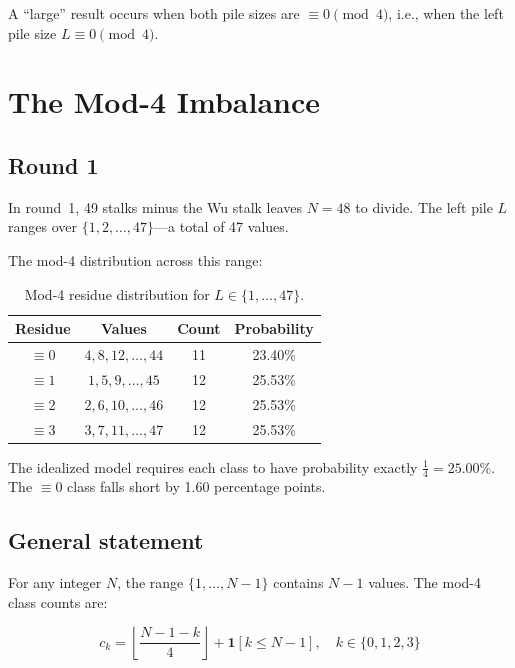 \documentclass{article}
\begin{document}
A ``large'' result occurs when both pile sizes are $\equiv 0 \pmod{4}$, i.e., when the left pile size $L \equiv 0 \pmod{4}$.

\section{The Mod-4 Imbalance}\label{sec:imbalance}

\subsection{Round 1}

In round~1, 49 stalks minus the Wu stalk leaves $N = 48$ to divide. The left pile $L$ ranges over $\{1, 2, \ldots, 47\}$---a total of 47 values.

The mod-4 distribution across this range:

\begin{table}[h]
\centering
\begin{tabular}{cccc}
\toprule
Residue & Values & Count & Probability \\
\midrule
$\equiv 0$ & $4, 8, 12, \ldots, 44$ & 11 & 23.40\% \\
$\equiv 1$ & $1, 5, 9, \ldots, 45$ & 12 & 25.53\% \\
$\equiv 2$ & $2, 6, 10, \ldots, 46$ & 12 & 25.53\% \\
$\equiv 3$ & $3, 7, 11, \ldots, 47$ & 12 & 25.53\% \\
\bottomrule
\end{tabular}
\caption{Mod-4 residue distribution for $L \in \{1, \ldots, 47\}$.}
\label{tab:mod4-round1}
\end{table}

The idealized model requires each class to have probability exactly $\frac{1}{4} = 25.00\%$. The $\equiv 0$ class falls short by 1.60 percentage points.

\subsection{General statement}

For any integer $N$, the range $\{1, \ldots, N-1\}$ contains $N-1$ values. The mod-4 class counts are:

\begin{equation}
c_k = \left\lfloor \frac{N-1-k}{4} \right\rfloor + \mathbf{1}[k \leq N-1], \quad k \in \{0,1,2,3\}
\end{equation}
\end{document}
